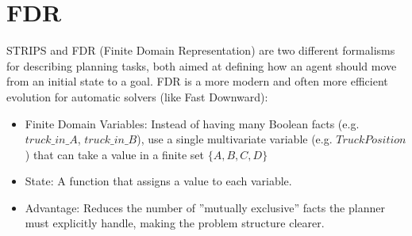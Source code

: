 \documentclass[10pt, letterpaper]{report}
\begin{document}
\section{FDR}
STRIPS and FDR (Finite Domain Representation) are two different formalisms for describing planning tasks, both aimed at defining how an agent should move from an initial state to a goal. FDR is a more modern and often more efficient evolution for automatic solvers (like Fast Downward):\begin{itemize}
    \item Finite Domain Variables: Instead of having many Boolean facts (e.g. $truck\_in\_A$, $truck\_in\_B$), use a single multivariate variable (e.g. $TruckPosition$) that can take a value in a finite set $\{A, B, C, D\}$ 
    \item State: A function that assigns a value to each variable.\item Advantage: Reduces the number of ''mutually exclusive'' facts the planner must explicitly handle, making the problem structure clearer.
\end{itemize}
\end{document}
